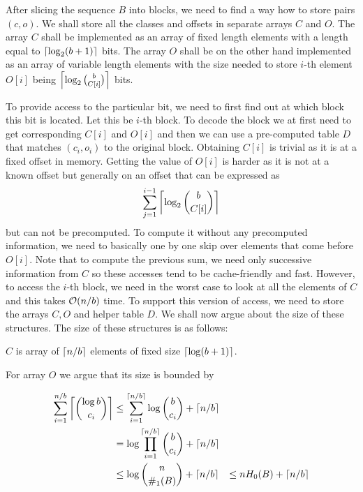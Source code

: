 After slicing the sequence $B$ into blocks, we need to find a way how to store pairs $(c, o)$.
We shall store all the classes and offsets in separate arrays $C$ and $O$. The array $C$ shall
be implemented as an array of fixed length elements with a length equal to
$\left\lceil \log_2(b+1) \right\rceil$ bits. The array $O$ shall be on the other hand implemented as an array of
variable length elements with the size needed to store $i$-th element $O[i]$ being
$\left\lceil \log_2{b\choose C[i]} \right\rceil$ bits.

To provide access to the particular bit, we need to first find out at which block this bit is located.
Let this be $i$-th block. To decode the block we at first need to get corresponding $C[i]$ and
$O[i]$ and then we can use a pre-computed table $D$ that matches $(c_i, o_i)$ to the original
block. Obtaining $C[i]$ is trivial as it is at a fixed offset in memory. Getting the value of
$O[i]$ is harder as it is not at a known offset but generally on an offset that can be expressed
as $$\sum_{j=1}^{i-1} \left\lceil \log_2{b\choose C[i]} \right\rceil$$ but can not be precomputed. To compute it
without any precomputed information, we need to basically one by one skip over elements that come
before $O[i]$. Note that to compute the previous sum, we need only successive information from $C$
so these accesses tend to be cache-friendly and fast. However, to access the $i$-th block, we need
in the worst case to look at all the elements of $C$ and this takes $\mathcal{O}(n/b)$ time. To support
this version of access, we need to store the arrays $C, O$ and helper table $D$. We shall
now argue about the size of these structures. The size of these structures is as follows:

$C$ is array of $\left\lceil n/b \right\rceil$ elements of fixed size $\left\lceil \log(b+1) \right\rceil$.

For array $O$ we argue that its size is bounded by

\begin{align*}
    \sum_{i=1}^{n/b} \left\lceil {\log b\choose c_i} \right\rceil
    &\leq \sum_{i=1}^{\left\lceil n/b \right\rceil} \log {b\choose c_i} + \left\lceil n/b \right\rceil \\
    &= \log\prod_{i=1}^{\left\lceil n/b \right\rceil} {b\choose c_i} + \left\lceil n/b \right\rceil \\
    &\leq \log{n\choose \#_1(B)} + \left\lceil n/b \right\rceil &\leq nH_0(B) + \left\lceil n/b \right\rceil
\end{align*}

